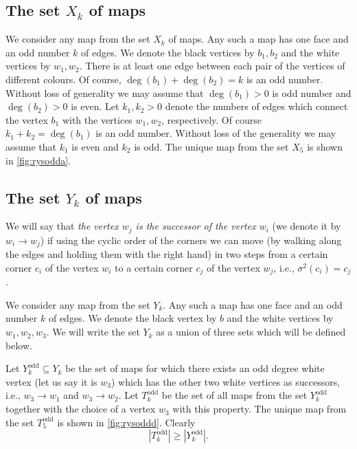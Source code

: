 \documentclass[submission]{FPSAC2021}
\DeclareMathOperator{\degg}{deg}
\DeclareMathOperator{\odd}{odd}
\newcommand{\nast}{\sigma}
\begin{document}
\subsection{The set $X_k$ of maps} 

We consider any map from the set $X_k$ of maps. Any such a
map has one face and an odd number $k$ of edges. We denote the black
vertices by $b_1, b_2$ and the white vertices by $w_1, w_2$. There is
at least one edge between each pair of the vertices of different colours.
Of course, $\degg(b_1)+\degg(b_2)=k$ is an odd number. Without loss of generality 
we may assume that $\degg(b_1)>0$ is odd number and $\degg(b_2)>0$ is even.
Let $k_1, k_2 > 0$ denote the numbers of edges which connect
the vertex $b_1$ with the vertices $w_1, w_2$, respectively. 
Of course $k_1+k_2=\degg(b_1)$ is an odd number. Without loss of the generality 
we may assume that $k_1$ is
even and $k_2$ is odd. The unique map from the
set $X_5$ is shown in \cref{fig:rysodda}.

\subsection{The set $Y_k$ of maps}

We will say that \emph{the vertex $w_j$ is the successor of the vertex
$w_i$} (we denote it by $w_i \rightarrow w_j$) 
if using the cyclic order of the corners we
can move (by walking along the edges and holding them with the right hand)
in two steps from a certain corner $c_i$ of the vertex $w_i$ to a certain
corner $c_j$ of the vertex $w_j$, i.e., $\nast^2(c_i)=c_j$. 

We consider any map from the set $Y_k$. Any such a map has one
face and an odd number $k$ of edges. We denote the black vertex by $b$
and  the white vertices by $w_1, w_2, w_3$. We will write the set $Y_k$ as
a union of three sets which will be defined below.

Let $Y_{k}^{\odd}\subseteq Y_k$ be the set of maps for which there exists an
odd degree white vertex (let us say it is $w_3$) which has the other two white vertices 
as successors, i.e., $w_3\rightarrow w_1$ and $w_3\rightarrow w_2$.
Let $T_k^{\odd}$ be the set of all maps from the set $Y_k^{\odd}$ 
together with the choice of a vertex $w_3$ with this property. 
The unique map from the set $T_{5}^{\odd}$ is shown in \cref{fig:rysoddd}. Clearly
\begin{equation}
\label{ineqodd}
|T_{k}^{\odd}| \geq |Y_{k}^{\odd}|.
\end{equation}
\end{document}

